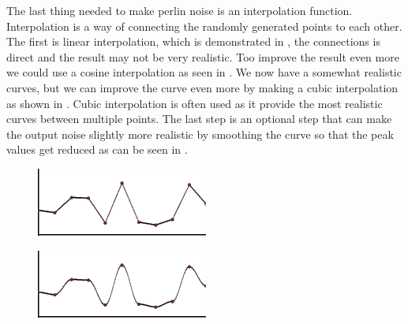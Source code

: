 The last thing needed to make perlin noise is an interpolation function. Interpolation is a way of connecting the randomly generated points to each other. The first is linear interpolation, which is demonstrated in , the connections is direct and the result may not be very realistic. Too improve the result even more we could use a cosine interpolation as seen in . We now have a somewhat realistic curves, but we can improve the curve even more by making a cubic interpolation as shown in . Cubic interpolation is often used as it provide the most realistic curves between multiple points. The last step is an optional step that can make the output noise slightly more realistic by smoothing the curve so that the peak values get reduced as can be seen in .


\begin{figure}[H]
	\begin{minipage}[b]{.5\linewidth}
		\includegraphics[width=0.95\linewidth]{img/m_inter1}
		\label{fig:1a}
	\end{minipage}
	\begin{minipage}[b]{.5\linewidth}
		\includegraphics[width=0.95\linewidth]{img/m_inter2}
		\label{fig:1b}

\end{minipage}
\end{figure}

